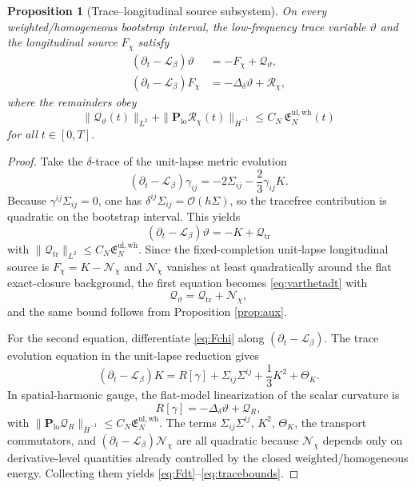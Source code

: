 \documentclass[11pt]{article}
\newcommand{\Ell}{\mathcal{L}}
\newtheorem{proposition}{Proposition}
\begin{document}
\begin{proposition}[Trace--longitudinal source subsystem]
\label{prop:trace}
On every weighted/homogeneous bootstrap interval, the low-frequency trace variable \(\vartheta\) and the longitudinal source \(F_\chi\) satisfy
\begin{align}
(\partial_t-\Ell_\beta)\vartheta
&=
-F_\chi + \mathcal Q_\vartheta,
\label{eq:varthetadt}
\\
(\partial_t-\Ell_\beta)F_\chi
&=
-\Delta_\delta \vartheta + \mathcal R_\chi,
\label{eq:Fdt}
\end{align}
where the remainders obey
\begin{equation}
\|\mathcal Q_\vartheta(t)\|_{L^2}
+ \|\mathbf P_{\mathrm{lo}}\mathcal R_\chi(t)\|_{\dot H^{-1}}
\le
C_N\,\mathfrak E_N^{\mathrm{ul,wh}}(t)
\label{eq:tracebounds}
\end{equation}
for all \(t\in[0,T]\).
\end{proposition}

\begin{proof}
Take the \(\delta\)-trace of the unit-lapse metric evolution
\[
(\partial_t-\Ell_\beta)\gamma_{ij}
=
-2\Sigma_{ij}
-\frac23\gamma_{ij}K.
\]
Because \(\gamma^{ij}\Sigma_{ij}=0\), one has \(\delta^{ij}\Sigma_{ij}=\mathcal O(h\Sigma)\), so the tracefree contribution is quadratic on the bootstrap interval. This yields
\[
(\partial_t-\Ell_\beta)\vartheta
=
-K+\mathcal Q_{\mathrm{tr}}
\]
with \(\|\mathcal Q_{\mathrm{tr}}\|_{L^2}\le C_N \mathfrak E_N^{\mathrm{ul,wh}}\). Since the fixed-completion unit-lapse longitudinal source is \(F_\chi=K-\mathcal N_\chi\) and \(\mathcal N_\chi\) vanishes at least quadratically around the flat exact-closure background, the first equation becomes \eqref{eq:varthetadt} with
\[
\mathcal Q_\vartheta = \mathcal Q_{\mathrm{tr}}+\mathcal N_\chi,
\]
and the same bound follows from Proposition \ref{prop:aux}.

For the second equation, differentiate \eqref{eq:Fchi} along \((\partial_t-\Ell_\beta)\). The trace evolution equation in the unit-lapse reduction gives
\[
(\partial_t-\Ell_\beta)K
=
R[\gamma]+\Sigma_{ij}\Sigma^{ij}+\frac13 K^2+\Theta_K.
\]
In spatial-harmonic gauge, the flat-model linearization of the scalar curvature is
\[
R[\gamma]=-\Delta_\delta \vartheta + \mathcal Q_R,
\]
with \(\|\mathbf P_{\mathrm{lo}}\mathcal Q_R\|_{\dot H^{-1}}\le C_N \mathfrak E_N^{\mathrm{ul,wh}}\). The terms \(\Sigma_{ij}\Sigma^{ij}\), \(K^2\), \(\Theta_K\), the transport commutators, and \((\partial_t-\Ell_\beta)\mathcal N_\chi\) are all quadratic because \(\mathcal N_\chi\) depends only on derivative-level quantities already controlled by the closed weighted/homogeneous energy. Collecting them yields \eqref{eq:Fdt}--\eqref{eq:tracebounds}.
\end{proof}
\end{document}
